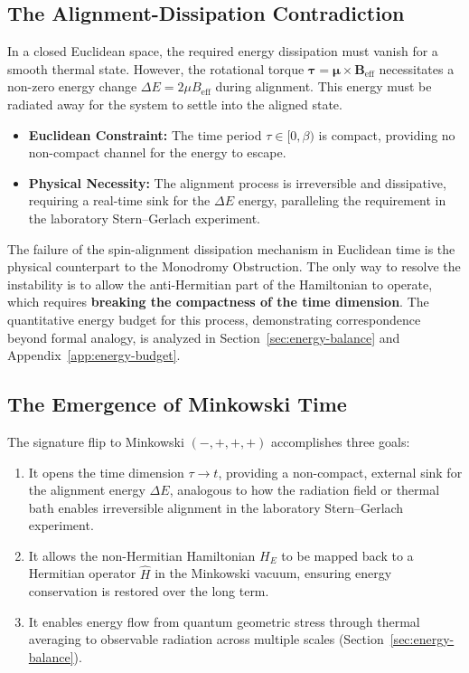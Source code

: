 \documentclass[11pt]{article}
\begin{document}
\subsection{The Alignment-Dissipation Contradiction}

In a closed Euclidean space, the required energy dissipation must vanish for a smooth 
thermal state. However, the rotational torque $\boldsymbol{\tau} = \boldsymbol{\mu} 
\times \mathbf{B}_{\text{eff}}$ necessitates a non-zero energy change $\Delta E = 2\mu 
B_{\text{eff}}$ during alignment. This energy must be radiated away for the system to 
settle into the aligned state.

\begin{itemize}
\item \textbf{Euclidean Constraint:} The time period $\tau \in [0,\beta)$ is compact, 
providing no non-compact channel for the energy to escape.

\item \textbf{Physical Necessity:} The alignment process is irreversible and dissipative, 
requiring a real-time sink for the $\Delta E$ energy, paralleling the requirement in 
the laboratory Stern--Gerlach experiment.
\end{itemize}

The failure of the spin-alignment dissipation mechanism in Euclidean time is the physical 
counterpart to the Monodromy Obstruction. The only way to resolve the instability is to 
allow the anti-Hermitian part of the Hamiltonian to operate, which requires 
\textbf{breaking the compactness of the time dimension}. The quantitative energy budget 
for this process, demonstrating correspondence beyond formal analogy, is analyzed in 
Section~\ref{sec:energy-balance} and Appendix~\ref{app:energy-budget}.

\subsection{The Emergence of Minkowski Time}

The signature flip to Minkowski $(-,+,+,+)$ accomplishes three goals:

\begin{enumerate}
\item It opens the time dimension $\tau \to t$, providing a non-compact, external sink 
for the alignment energy $\Delta E$, analogous to how the radiation field or thermal bath 
enables irreversible alignment in the laboratory Stern--Gerlach experiment.

\item It allows the non-Hermitian Hamiltonian $H_E$ to be mapped back to a Hermitian 
operator $\widehat{H}$ in the Minkowski vacuum, ensuring energy conservation is restored 
over the long term.

\item It enables energy flow from quantum geometric stress through thermal averaging to 
observable radiation across multiple scales (Section~\ref{sec:energy-balance}).
\end{enumerate}
\end{document}

